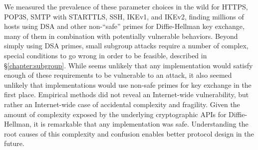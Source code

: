 We measured the prevalence of these parameter choices in the wild for HTTPS,
POP3S, SMTP with STARTTLS, SSH, IKEv1, and IKEv2, finding millions of hosts
using DSA and other non-``safe'' primes for Diffie-Hellman key exchange, many
of them in combination with potentially vulnerable behaviors. Beyond simply
using DSA primes, small subgroup attacks require a number of complex, special
conditions to go wrong in order to be feasible, described in
\S\ref{chapter:subgroup}. While seems unlikely that any implementation would
satisfy enough of these requirements to be vulnerable to an attack, it also
seemed unlikely that implementations would use non-safe primes for key
exchange in the first place. Empirical methods did not reveal an
Internet-wide vulnerability, but rather an Internet-wide case of accidental
complexity and fragility. Given the amount of complexity exposed by the
underlying cryptographic APIs for Diffie-Hellman, it is remarkable that any
implementation was safe. Understanding the root causes of this complexity and
confusion enables better protocol design in the future.


% 
% 

